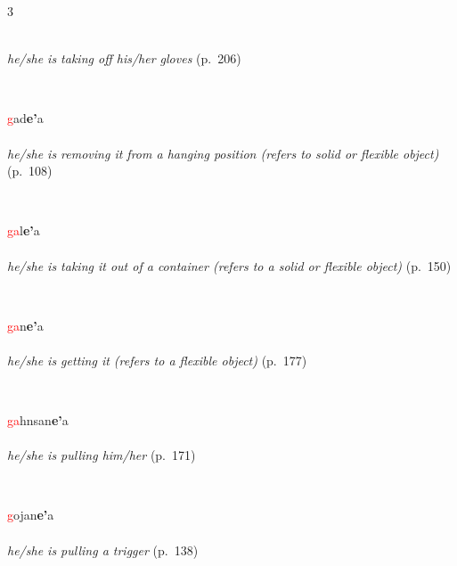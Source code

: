 \documentclass[oneside,openany]{book}%
\begin{document}
\begin{multicols}{3}
\begin{minipage}[t]{\linewidth}
\\
\noindent \textit{he/she is taking off his/her gloves} (p.~206)
\end{minipage}\\[1em]%
\begin{minipage}[t]{\linewidth}
\raggedright\noindent \textcolor{Red}{g}ad\textbf{e'}a\\
\\
\noindent \textit{he/she is removing it from a hanging position (refers to solid or flexible object)} (p.~108)
\end{minipage}\\[1em]%
\begin{minipage}[t]{\linewidth}
\raggedright\noindent \textcolor{Red}{ga}l\textbf{e'}a\\
\\
\noindent \textit{he/she is taking it out of a container (refers to a solid or flexible object)} (p.~150)
\end{minipage}\\[1em]%
\begin{minipage}[t]{\linewidth}
\raggedright\noindent \textcolor{Red}{ga}n\textbf{e'}a\\
\\
\noindent \textit{he/she is getting it (refers to a flexible object)} (p.~177)
\end{minipage}\\[1em]%
\begin{minipage}[t]{\linewidth}
\raggedright\noindent \textcolor{Red}{ga}hnsan\textbf{e'}a\\
\\
\noindent \textit{he/she is pulling him/her} (p.~171)
\end{minipage}\\[1em]%
\begin{minipage}[t]{\linewidth}
\raggedright\noindent \textcolor{Red}{g}ojan\textbf{e'}a\\
\\
\noindent \textit{he/she is pulling a trigger} (p.~138)
\end{minipage}\\[1em]%

\end{multicols}
\end{document}
